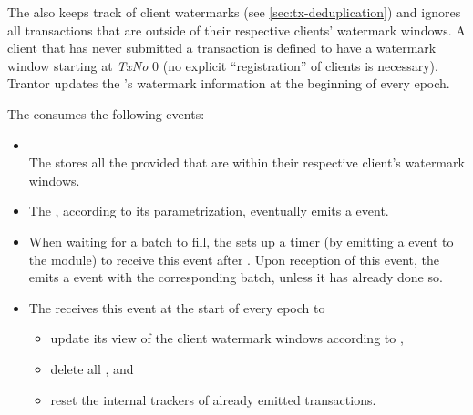 \documentclass{article}
\begin{document}
The  also keeps track of client watermarks (see \cref{sec:tx-deduplication})
and ignores all transactions that are outside of their respective clients' watermark windows.
A client that has never submitted a transaction is defined to have a watermark window starting at \textit{TxNo} 0
(no explicit ``registration'' of clients is necessary).
Trantor updates the 's watermark information at the beginning of every epoch.

The  consumes the following events:

\begin{itemize}

    \item {}\\
    The  stores all the provided  that are within their respective client's watermark windows.

    \item {}
    The , according to its parametrization, eventually emits a  event.

    \item {}
    When waiting for a batch to fill, the  sets up a timer
    (by emitting a  event to the  module)
    to receive this event after .
    Upon reception of this event, the  emits a  event with the corresponding batch, unless it has already done so.

    \item {}
    The  receives this event at the start of every epoch to
    \begin{itemize}
        \item update its view of the client watermark windows according to ,
        \item delete all , and
        \item reset the internal trackers of already emitted transactions.
    \end{itemize}

\end{itemize}

\subsubsection{}
\end{document}
